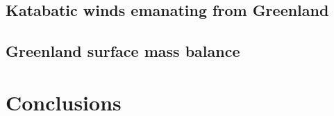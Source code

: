 \documentclass[draft]{agujournal2019}
\begin{document}
\subsection{Katabatic winds emanating from Greenland}
\subsection{Greenland surface mass balance}

%
%
%
%

\section{Conclusions}\label{sec:conclusions}
\end{document}
